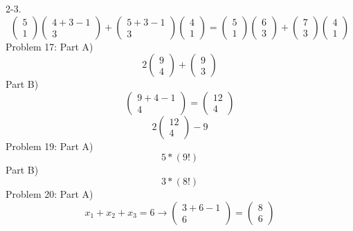 \documentclass{article}
\begin{document}
	2-3.
	$$
	\left(\begin{array}{c}
	5\\
	1
	\end{array}\right)
	\left(\begin{array}{c}
	4+3-1\\
	3
	\end{array}\right)
	+
	\left(\begin{array}{c}
	5+3-1\\
	3
	\end{array}\right)
	\left(\begin{array}{c}
	4\\
	1
	\end{array}\right)
	=
	\left(\begin{array}{c}
	5\\
	1
	\end{array}\right)
	\left(\begin{array}{c}
	6\\
	3
	\end{array}\right)
	+
	\left(\begin{array}{c}
	7\\
	3
	\end{array}\right)
	\left(\begin{array}{c}
	4\\
	1
	\end{array}\right)
	$$
	Problem 17: Part A)
	$$
	2	
	\left(\begin{array}{c}
	9\\
	4
	\end{array}\right)
	+
	\left(\begin{array}{c}
	9\\
	3
	\end{array}\right)
	$$
	Part B)
	$$
	\left(\begin{array}{c}
	9+4-1\\
	4
	\end{array}\right)
	=
	\left(\begin{array}{c}
	12\\
	4
	\end{array}\right)
	$$
	$$
	2
	\left(\begin{array}{c}
	12\\
	4
	\end{array}\right)
	-
	9
	$$
	Problem 19: Part A)
	$$
	5*(9!)
	$$
	Part B)
	$$
	3*(8!)
	$$
	Problem 20: Part A)
	$$
	x_1+x_2+x_3=6 \rightarrow
	\left(\begin{array}{c}
	3+6-1\\
	6
	\end{array}\right)
	=
	\left(\begin{array}{c}
	8\\
	6
	\end{array}\right)
	$$
\end{document}
